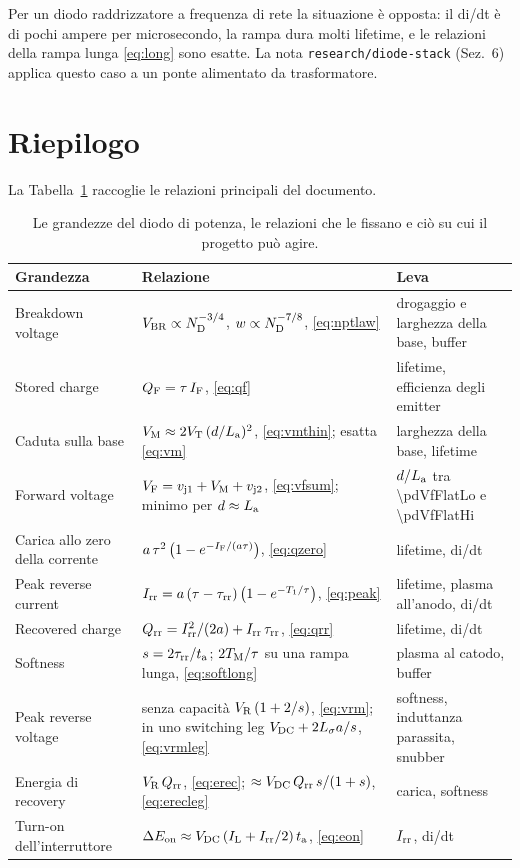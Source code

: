 \documentclass[10pt,a4paper]{scrartcl}
\let\newcommand\pdvaluedefine
\newcommand{\IF}{I_\mathrm{F}}
\newcommand{\VR}{V_\mathrm{R}}
\newcommand{\VF}{V_\mathrm{F}}
\newcommand{\Irr}{I_\mathrm{rr}}
\newcommand{\Qrr}{Q_\mathrm{rr}}
\newcommand{\ta}{t_\mathrm{a}}
\newcommand{\taurr}{\tau_\mathrm{rr}}
\newcommand{\TM}{T_\mathrm{M}}
\newcommand{\Tone}{T_1}
\newcommand{\vjo}{v_\mathrm{j1}}
\newcommand{\vjt}{v_\mathrm{j2}}
\newcommand{\VT}{V_\mathrm{T}}
\newcommand{\Ls}{L_\sigma}                    %
\newcommand{\ND}{N_\mathrm{D}}
\newcommand{\La}{L_\mathrm{a}}
\newcommand{\VM}{V_\mathrm{M}}
\newcommand{\Vbr}{V_\mathrm{BR}}
\newcommand{\Vdc}{V_\mathrm{DC}}
\newcommand{\QF}{Q_\mathrm{F}}
\begin{document}
Per un diodo raddrizzatore a frequenza di rete la situazione è opposta: il di/dt è di pochi ampere per microsecondo, la rampa dura molti lifetime, e le relazioni della rampa lunga \eqref{eq:long} sono esatte. La nota \texttt{research/diode-stack} (Sez.~6) applica questo caso a un ponte alimentato da trasformatore.

\section{Riepilogo}
\label{sec:summary}
La Tabella~\ref{tab:summary} raccoglie le relazioni principali del documento.

\begin{table}[htb]
\centering\small
\caption{Le grandezze del diodo di potenza, le relazioni che le fissano e ciò su cui il progetto può agire.}
\label{tab:summary}
\begin{tabular}{@{}l>{\raggedright\arraybackslash}p{6.6cm}>{\raggedright\arraybackslash}p{5.2cm}@{}}
\toprule
Grandezza & Relazione & Leva \\
\midrule
Breakdown voltage & $\Vbr \propto \ND^{-3/4}$, $w \propto \ND^{-7/8}$, \eqref{eq:nptlaw} & drogaggio e larghezza della base, buffer \\
Stored charge & $\QF = \tau\,\IF$, \eqref{eq:qf} & lifetime, efficienza degli emitter \\
Caduta sulla base & $\VM \approx 2\VT\,(d/\La)^2$, \eqref{eq:vmthin}; esatta \eqref{eq:vm} & larghezza della base, lifetime \\
Forward voltage & $\VF = \vjo + \VM + \vjt$, \eqref{eq:vfsum}; minimo per $d \approx \La$ & $d/\La$ tra \num{\pdVfFlatLo} e \num{\pdVfFlatHi} \\
Carica allo zero della corrente & $a\,\tau^2\,\bigl(1-e^{-\IF/(a\tau)}\bigr)$, \eqref{eq:qzero} & lifetime, di/dt \\
Peak reverse current & $\Irr = a\,(\tau-\taurr)\,\bigl(1-e^{-\Tone/\tau}\bigr)$, \eqref{eq:peak} & lifetime, plasma all'anodo, di/dt \\
Recovered charge & $\Qrr = \Irr^2/(2a) + \Irr\,\taurr$, \eqref{eq:qrr} & lifetime, di/dt \\
Softness & $s = 2\taurr/\ta$; $2\TM/\tau$ su una rampa lunga, \eqref{eq:softlong} & plasma al catodo, buffer \\
Peak reverse voltage & senza capacità $\VR\,(1+2/s)$, \eqref{eq:vrm}; in uno switching leg $\Vdc + 2\Ls a/s$, \eqref{eq:vrmleg} & softness, induttanza parassita, snubber \\
Energia di recovery & $\VR\,\Qrr$, \eqref{eq:erec}; $\approx \Vdc\,\Qrr\,s/(1+s)$, \eqref{eq:erecleg} & carica, softness \\
Turn-on dell'interruttore & $\Delta E_\mathrm{on} \approx \Vdc\,(I_\mathrm{L} + \Irr/2)\,\ta$, \eqref{eq:eon} & $\Irr$, di/dt \\
\bottomrule
\end{tabular}
\end{table}
\end{document}
